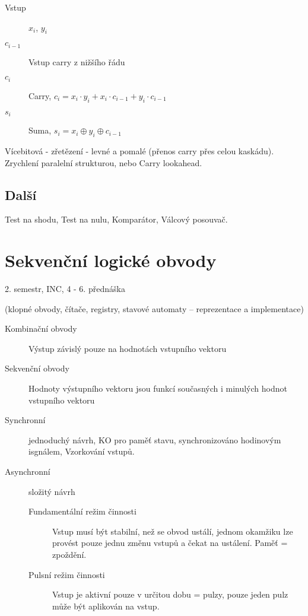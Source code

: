 \documentclass[a4wide]{report}
\begin{document}
\begin{description}
	\item[Vstup] $x_i$, $y_i$
	\item[$c_{i-1}$] Vstup carry z nižšího řádu
	\item[$c_i$] Carry, $ c_i = x_i \cdot y_i + x_i \cdot c_{i-1} + y_i \cdot c_{i-1}$
	\item[$s_i$] Suma, $ s_i = x_i \oplus y_i \oplus c_{i-1}$
\end{description}

Vícebitová - zřetězení - levné a pomalé (přenos carry přes celou kaskádu). Zrychlení paralelní strukturou, nebo Carry lookahead.

\section{Další}

Test na shodu, Test na nulu, Komparátor, Válcový posouvač.





















\chapter{Sekvenční logické obvody } \label{cha:3}

2. semestr, INC, 4 - 6. přednáška

(klopné obvody, čítače, registry, stavové automaty – reprezentace a implementace)

\begin{description}
	\item[Kombinační obvody] Výstup závislý pouze na hodnotách vstupního vektoru
	\item[Sekvenční obvody] Hodnoty výstupního vektoru jsou funkcí současných i minulých hodnot vstupního vektoru
\end{description}

\begin{description}
	\item[Synchronní] jednoduchý návrh, KO pro paměť stavu, synchronizováno hodinovým isgnálem, Vzorkování vstupů.
	\item[Asynchronní] složitý návrh
	\begin{description}
		\item[Fundamentální režim činnosti] Vstup musí být stabilní, než se obvod ustálí, jednom okamžiku lze provést pouze jednu změnu vstupů a čekat na ustálení. Paměť = zpoždění.
		\item[Pulsní režim činnosti] Vstup je aktivní pouze v určitou dobu = pulzy, pouze jeden pulz může být aplikován na vstup.
	\end{description}
\end{description}
\end{document}
